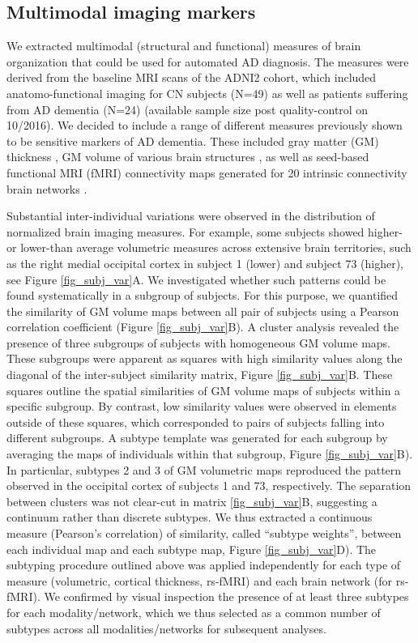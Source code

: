\documentclass[authoryear]{elsarticle}
\begin{document}
\subsection*{Multimodal imaging markers}
We extracted multimodal (structural and functional) measures of brain organization that could be used for automated AD diagnosis. The measures were derived from the baseline MRI scans of the ADNI2 cohort, which included anatomo-functional imaging for CN subjects (N=49) as well as patients suffering from AD dementia (N=24) (available sample size post quality-control on 10/2016). We decided to include a range of different measures previously shown to be sensitive markers of AD dementia. These included gray matter (GM) thickness \citep{Querbes2009,Eskildsen2013}, GM volume of various brain structures \citep{Karas2004}, as well as seed-based functional MRI (fMRI) connectivity maps generated for 20 intrinsic connectivity brain networks \citep{Urchs2017}.

Substantial inter-individual variations were observed in the distribution of normalized brain imaging measures. For example, some subjects showed higher- or lower-than average volumetric measures across extensive brain territories, such as the right medial occipital cortex in subject 1 (lower) and subject 73 (higher), see Figure \ref{fig_subj_var}A. We investigated whether such patterns could be found systematically in a subgroup of subjects. For this purpose, we quantified the similarity of GM volume maps between all pair of subjects using a Pearson correlation coefficient (Figure \ref{fig_subj_var}B). A cluster analysis revealed the presence of three subgroups of subjects with homogeneous GM volume maps. These subgroups were apparent as squares with high similarity values along the diagonal of the inter-subject similarity matrix, Figure \ref{fig_subj_var}B. These squares outline the spatial similarities of GM volume maps of subjects within a specific subgroup. By contrast, low similarity values were observed in elements outside of these squares, which corresponded to pairs of subjects falling into different subgroups. A subtype template was generated for each subgroup by averaging the maps of individuals within that subgroup, Figure \ref{fig_subj_var}B). In particular, subtypes 2 and 3 of GM volumetric maps reproduced the pattern observed in the occipital cortex of  subjects 1 and 73, respectively. The separation between clusters was not clear-cut in matrix \ref{fig_subj_var}B, suggesting a continuum rather than discrete subtypes. We thus extracted a continuous measure (Pearson's correlation) of similarity, called ``subtype weights'', between each individual map and each subtype map, Figure \ref{fig_subj_var}D). The subtyping procedure outlined above was applied independently for each type of measure (volumetric, cortical thickness, rs-fMRI) and each brain network (for rs-fMRI). We confirmed by visual inspection the presence of at least three subtypes for each modality/network, which we thus selected as a common number of subtypes across all modalities/networks for subsequent analyses.
\end{document}
